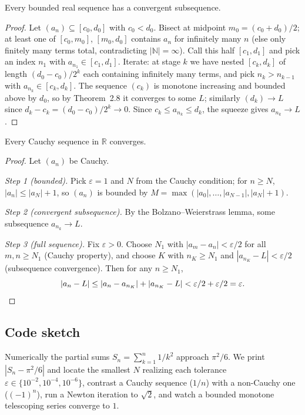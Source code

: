 \begin{lemma}
Every bounded real sequence has a convergent subsequence.
\end{lemma}

\begin{proof}
Let $(a_n) \subseteq [c_0, d_0]$ with $c_0 < d_0$. Bisect at midpoint $m_0 = (c_0 + d_0)/2$; at least one of $[c_0, m_0]$, $[m_0, d_0]$ contains $a_n$ for infinitely many $n$ (else only finitely many terms total, contradicting $|\mathbb{N}| = \infty$). Call this half $[c_1, d_1]$ and pick an index $n_1$ with $a_{n_1} \in [c_1, d_1]$. Iterate: at stage $k$ we have nested $[c_k, d_k]$ of length $(d_0 - c_0) / 2^k$ each containing infinitely many terms, and pick $n_k > n_{k-1}$ with $a_{n_k} \in [c_k, d_k]$. The sequence $(c_k)$ is monotone increasing and bounded above by $d_0$, so by Theorem~2.8 it converges to some $L$; similarly $(d_k) \to L$ since $d_k - c_k = (d_0 - c_0)/2^k \to 0$. Since $c_k \leq a_{n_k} \leq d_k$, the squeeze gives $a_{n_k} \to L$.
\end{proof}

\begin{theorem}
Every Cauchy sequence in $\mathbb{R}$ converges.
\end{theorem}

\begin{proof}
Let $(a_n)$ be Cauchy.

\emph{Step 1 (bounded).} Pick $\varepsilon = 1$ and $N$ from the Cauchy condition; for $n \geq N$, $|a_n| \leq |a_N| + 1$, so $(a_n)$ is bounded by $M = \max(|a_0|, \ldots, |a_{N-1}|, |a_N| + 1)$.

\emph{Step 2 (convergent subsequence).} By the Bolzano--Weierstrass lemma, some subsequence $a_{n_k} \to L$.

\emph{Step 3 (full sequence).} Fix $\varepsilon > 0$. Choose $N_1$ with $|a_m - a_n| < \varepsilon/2$ for all $m, n \geq N_1$ (Cauchy property), and choose $K$ with $n_K \geq N_1$ and $|a_{n_K} - L| < \varepsilon/2$ (subsequence convergence). Then for any $n \geq N_1$,
\[
|a_n - L| \leq |a_n - a_{n_K}| + |a_{n_K} - L| < \varepsilon/2 + \varepsilon/2 = \varepsilon. \qedhere
\]
\end{proof}

\subsection*{Code sketch}

Numerically the partial sums $S_n = \sum_{k=1}^n 1/k^2$ approach $\pi^2/6$. We print $|S_n - \pi^2/6|$ and locate the smallest $N$ realizing each tolerance $\varepsilon \in \{10^{-2}, 10^{-4}, 10^{-6}\}$, contrast a Cauchy sequence ($1/n$) with a non-Cauchy one ($(-1)^n$), run a Newton iteration to $\sqrt{2}$, and watch a bounded monotone telescoping series converge to $1$.

